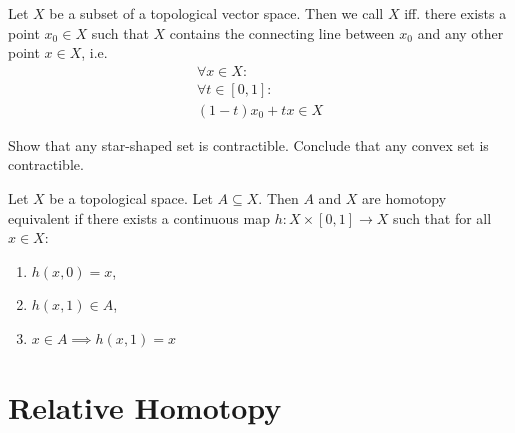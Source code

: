\begin{definition}
	Let $X$ be a subset of a topological vector space. Then we call $X$  iff. there exists a point $x_0 \in X$ such that $X$ contains the connecting line between $x_0$ and any other point $x \in X$, i.e.
	\begin{align*}
		\forall x \in X:\\
		\forall t \in [0,1]:\\	
		(1-t)x_0 + tx \in X
	\end{align*}
\end{definition}
\begin{exercise}
	Show that any star-shaped set is contractible. Conclude that any convex set is contractible.
\end{exercise}
\begin{lemma}
	Let $X$ be a topological space. Let $A \subseteq X$. Then $A$ and $X$ are homotopy equivalent if there exists a continuous map $h : X \times [0,1] \to X$ such that for all $x \in X$:
	\begin{enumerate}
		\item $h(x,0) = x$,
		\item $h(x,1) \in A$,
		\item $x \in A \implies h(x,1) = x$
	\end{enumerate}
\end{lemma}

\clearpage

\section{Relative Homotopy}

